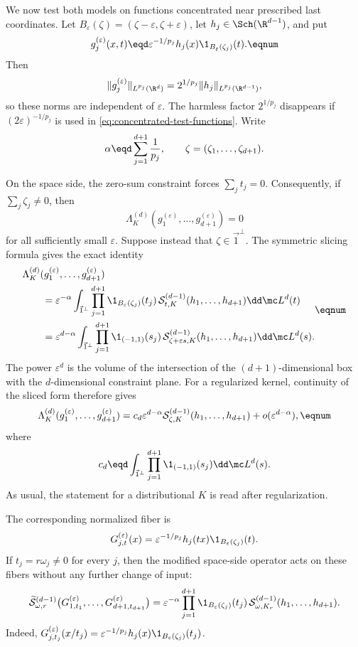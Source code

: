 We now test both models on functions concentrated near prescribed last
coordinates.  Let \(B_\varepsilon(\zeta)=(\zeta-\varepsilon,
\zeta+\varepsilon)\), let \(h_j\in\Sch(\R^{d-1})\), and put
\[
  g_j^{(\varepsilon)}(x,t)
  \eqd
  \varepsilon^{-1/p_j}h_j(x)
  \1_{B_\varepsilon(\zeta_j)}(t).
  \eqnum \label{eq:concentrated-test-functions}
\]
Then
\[
  \|g_j^{(\varepsilon)}\|_{L^{p_j}(\R^d)}
  =2^{1/p_j}\|h_j\|_{L^{p_j}(\R^{d-1})},
\]
so these norms are independent of \(\varepsilon\).  The harmless factor
\(2^{1/p_j}\) disappears if \((2\varepsilon)^{-1/p_j}\) is used in
\eqref{eq:concentrated-test-functions}.  Write
\[
  \alpha\eqd\sum_{j=1}^{d+1}\frac1{p_j},
  \qquad
  \zeta=(\zeta_1,\ldots,\zeta_{d+1}).
\]

On the space side, the zero-sum constraint forces
\(\sum_jt_j=0\).  Consequently, if \(\sum_j\zeta_j\ne0\), then
\[
  \Lambda_K^{(d)}
  (g_1^{(\varepsilon)},\ldots,g_{d+1}^{(\varepsilon)})=0
\]
for all sufficiently small \(\varepsilon\).  Suppose instead that
\(\zeta\in\vec1^\perp\).  The symmetric slicing formula gives the exact
identity
\[
\begin{aligned}
  &\Lambda_K^{(d)}
  (g_1^{(\varepsilon)},\ldots,g_{d+1}^{(\varepsilon)})\\
  &\qquad=
  \varepsilon^{-\alpha}
  \int_{\vec1^\perp}
  \prod_{j=1}^{d+1}
  \1_{B_\varepsilon(\zeta_j)}(t_j)\,
  \mathcal S_{t,K}^{(d-1)}(h_1,\ldots,h_{d+1})
  \dd\mc L^d(t)\\
  &\qquad=
  \varepsilon^{d-\alpha}
  \int_{\vec1^\perp}
  \prod_{j=1}^{d+1}\1_{(-1,1)}(s_j)\,
  \mathcal S_{\zeta+\varepsilon s,K}^{(d-1)}
  (h_1,\ldots,h_{d+1})
  \dd\mc L^d(s).
\end{aligned}
\eqnum \label{eq:space-concentration-identity}
\]
The power \(\varepsilon^d\) is the volume of the intersection of the
\((d+1)\)-dimensional box with the \(d\)-dimensional constraint plane.
For a regularized kernel, continuity of the sliced form therefore gives
\[
  \Lambda_K^{(d)}
  (g_1^{(\varepsilon)},\ldots,g_{d+1}^{(\varepsilon)})
  =
  c_d\varepsilon^{d-\alpha}
  \mathcal S_{\zeta,K}^{(d-1)}(h_1,\ldots,h_{d+1})
  +o(\varepsilon^{d-\alpha}),
  \eqnum \label{eq:space-concentration-asymptotic}
\]
where
\[
  c_d\eqd
  \int_{\vec1^\perp}
  \prod_{j=1}^{d+1}\1_{(-1,1)}(s_j)\dd\mc L^d(s).
\]
As usual, the statement for a distributional \(K\) is read after
regularization.

The corresponding normalized fiber is
\[
  G_{j,t}^{(\varepsilon)}(x)
  =
  \varepsilon^{-1/p_j}
  h_j(tx)\1_{B_\varepsilon(\zeta_j)}(t).
\]
If \(t_j=r\omega_j\ne0\) for every \(j\), then the modified space-side
operator acts on these fibers without any further change of input:
\[
  \widetilde{\mathcal S}_{\omega,r}^{(d-1)}
  \bigl(
    G_{1,t_1}^{(\varepsilon)},\ldots,
    G_{d+1,t_{d+1}}^{(\varepsilon)}
  \bigr)
  =
  \varepsilon^{-\alpha}
  \prod_{j=1}^{d+1}\1_{B_\varepsilon(\zeta_j)}(t_j)\,
  \mathcal S_{\omega,K_r}^{(d-1)}
  (h_1,\ldots,h_{d+1}).
\]
Indeed,
\(G_{j,t_j}^{(\varepsilon)}(x/t_j)
=\varepsilon^{-1/p_j}h_j(x)
\1_{B_\varepsilon(\zeta_j)}(t_j)\).

